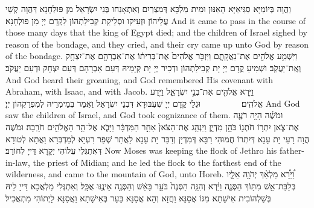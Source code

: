 {{וַהֲוָה בְּיוֹמַיָּא סַגִּיאַיָּא הָאִנּוּן וּמִית מַלְכָּא דְּמִצְרַיִם וְאִתְאָנַחוּ בְּנֵי יִשְׂרָאֵל מִן פּוּלְחָנָא דַּהֲוָה קְשֵׁי עֲלֵיהוֹן וּזְעִיקוּ וּסְלֵיקַת קְבִילַתְהוֹן לִקְדָם יְיָ מִן פּוּלְחָנָא׃}
{And it came to pass in the course of those many days that the king of Egypt died; and the children of Israel sighed by reason of the bondage, and they cried, and their cry came up unto God by reason of the bondage.}{}
{וַיִּשְׁמַ֥ע אֱלֹהִ֖ים אֶת־נַאֲקָתָ֑ם וַיִּזְכֹּ֤ר אֱלֹהִים֙ אֶת־בְּרִית֔וֹ אֶת־אַבְרָהָ֖ם אֶת־יִצְחָ֥ק וְאֶֽת־יַעֲקֹֽב׃
}
{וּשְׁמִיעַ קֳדָם יְיָ יָת קְבִילַתְהוֹן וּדְכִיר יְיָ יָת קְיָמֵיהּ דְּעִם אַבְרָהָם דְּעִם יִצְחָק וּדְעִם יַעֲקֹב׃}
{And God heard their groaning, and God remembered His covenant with Abraham, with Isaac, and with Jacob.}{}
{וַיַּ֥רְא אֱלֹהִ֖ים אֶת־בְּנֵ֣י יִשְׂרָאֵ֑ל וַיֵּ֖דַע אֱלֹהִֽים׃ \setuma         
}
{וּגְלֵי קֳדָם יְיָ שִׁעְבּוּדָא דִּבְנֵי יִשְׂרָאֵל וַאֲמַר בְּמֵימְרֵיהּ לְמִפְרַקְהוֹן יְיָ׃}
{And God saw the children of Israel, and God took cognizance of them.}{}
\newperek
{}%
{וּמֹשֶׁ֗ה הָיָ֥ה רֹעֶ֛ה אֶת־צֹ֛אן יִתְר֥וֹ חֹתְנ֖וֹ כֹּהֵ֣ן מִדְיָ֑ן וַיִּנְהַ֤ג אֶת־הַצֹּאן֙ אַחַ֣ר הַמִּדְבָּ֔ר וַיָּבֹ֛א אֶל־הַ֥ר הָאֱלֹהִ֖ים חֹרֵֽבָה׃
}
{וּמֹשֶׁה הֲוָה רָעֵי יָת עָנָא דְּיִתְרוֹ חֲמוּהִי רַבָּא דְּמִדְיָן וְדַבַּר יָת עָנָא לַאֲתַר שְׁפַר רִעְיָא לְמַדְבְּרָא וַאֲתָא לְטוּרָא דְּאִתְגְּלִי עֲלוֹהִי יְקָרָא דַּייָ לְחוֹרֵב׃}
{Now Moses was keeping the flock of Jethro his father-in-law, the priest of Midian; and he led the flock to the farthest end of the wilderness, and came to the mountain of God, unto Horeb.}{}
{וַ֠יֵּרָ֠א מַלְאַ֨ךְ יְהֹוָ֥ה אֵלָ֛יו בְּלַבַּת־אֵ֖שׁ מִתּ֣וֹךְ הַסְּנֶ֑ה וַיַּ֗רְא וְהִנֵּ֤ה הַסְּנֶה֙ בֹּעֵ֣ר בָּאֵ֔שׁ וְהַסְּנֶ֖ה אֵינֶ֥נּוּ אֻכָּֽל׃
}
{וְאִתְגְּלִי מַלְאֲכָא דַּייָ לֵיהּ בְּשַׁלְהוֹבִית אִישָׁתָא מִגּוֹ אֲסַנָּא וַחֲזָא וְהָא אֲסַנָּא בָּעַר בְּאִישָׁתָא וַאֲסַנָּא לָיְתוֹהִי מִתְאֲכִיל׃}
}
